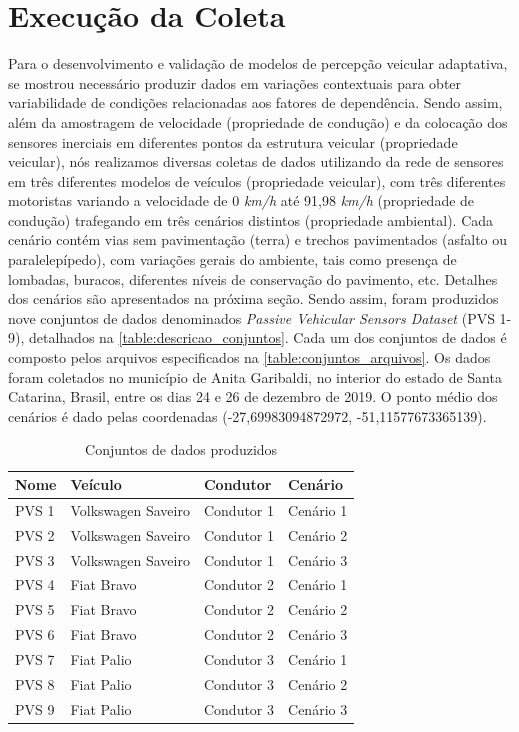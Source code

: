\section{Execução da Coleta}

Para o desenvolvimento e validação de modelos de percepção veicular adaptativa, se mostrou necessário produzir dados em variações contextuais para obter variabilidade de condições relacionadas aos fatores de dependência. Sendo assim, além da amostragem de velocidade (propriedade de condução) e da colocação dos sensores inerciais em diferentes pontos da estrutura veicular (propriedade veicular), nós realizamos diversas coletas de dados utilizando da rede de sensores em três diferentes modelos de veículos (propriedade veicular), com três diferentes motoristas variando a velocidade de 0 \emph{km/h} até 91,98 \emph{km/h} (propriedade de condução) trafegando em três cenários distintos (propriedade ambiental). Cada cenário contém vias sem pavimentação (terra) e trechos pavimentados (asfalto ou paralelepípedo), com variações gerais do ambiente, tais como presença de lombadas, buracos, diferentes níveis de conservação do pavimento, etc. Detalhes dos cenários são apresentados na próxima seção. Sendo assim, foram produzidos nove conjuntos de dados denominados \textit{Passive Vehicular Sensors Dataset} (PVS 1-9), detalhados na \autoref{table:descricao_conjuntos}. Cada um dos conjuntos de dados é composto pelos arquivos especificados na \autoref{table:conjuntos_arquivos}. Os dados foram coletados no município de Anita Garibaldi, no interior do estado de Santa Catarina, Brasil, entre os dias 24 e 26 de dezembro de 2019. O ponto médio dos cenários é dado pelas coordenadas (-27,69983094872972, -51,11577673365139).

\begin{table}[H]
\scriptsize
\caption{Conjuntos de dados produzidos} 
\label{table:descricao_conjuntos}
\centering
\begin{tabular}{llll}
\toprule
\textbf{Nome} & \textbf{Veículo} & \textbf{Condutor} & \textbf{Cenário} \\ \midrule
PVS 1 & Volkswagen Saveiro & Condutor 1 & Cenário 1 \\ \midrule
PVS 2 & Volkswagen Saveiro & Condutor 1 & Cenário 2 \\ \midrule
PVS 3 & Volkswagen Saveiro & Condutor 1 & Cenário 3 \\ \midrule
PVS 4 & Fiat Bravo & Condutor 2 & Cenário 1 \\ \midrule
PVS 5 & Fiat Bravo & Condutor 2 & Cenário 2 \\ \midrule
PVS 6 & Fiat Bravo & Condutor 2 & Cenário 3 \\ \midrule
PVS 7 & Fiat Palio & Condutor 3 & Cenário 1 \\ \midrule
PVS 8 & Fiat Palio & Condutor 3 & Cenário 2 \\ \midrule
PVS 9 & Fiat Palio & Condutor 3 & Cenário 3 \\ \bottomrule
\end{tabular}
\end{table}

